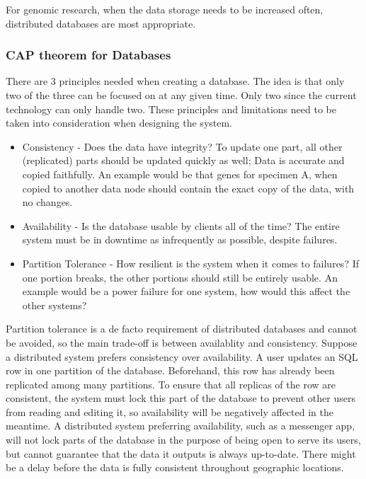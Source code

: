 \documentclass[acmsmall]{acmart}
\begin{document}
For genomic research, when the data storage needs to be increased often, distributed databases are most appropriate.

\subsubsection{CAP theorem for Databases} 
There are 3 principles needed when creating a database. The idea is that only two of the three can be focused on at any given time. Only two since the current technology can only handle two. These principles and limitations need to be taken into consideration when designing the system. 

\begin{itemize}
    \item Consistency - Does the data have integrity? To update one part, all other (replicated) parts should be updated quickly as well; Data is accurate and copied faithfully. An example would be that genes for specimen A, when copied to another data node should contain the exact copy of the data, with no changes.
    \item Availability - Is the database usable by clients all of the time? The entire system must be in downtime as infrequently as possible, despite failures.
    \item Partition Tolerance - How resilient is the system when it comes to failures? If one portion breaks, the other portions should still be entirely usable. An example would be a power failure for one system, how would this affect the other systems?
\end{itemize}

Partition tolerance is a de facto requirement of distributed databases and cannot be avoided, so the main trade-off is between availablity and consistency. \cite{Silberschatz2010} Suppose a distributed system prefers consistency over availability. A user updates an SQL row in one partition of the database. Beforehand, this row has already been replicated among many partitions. To ensure that all replicas of the row are consistent, the system must lock this part of the database to prevent other users from reading and editing it, so availability will be negatively affected in the meantime. A distributed system preferring availability, such as a messenger app, will not lock parts of the database in the purpose of being open to serve its users, but cannot guarantee that the data it outputs is always up-to-date. There might be a delay before the data is fully consistent throughout geographic locations.
\end{document}
